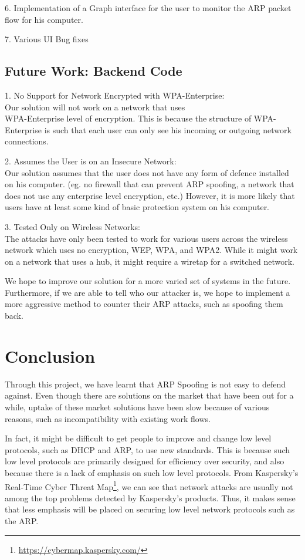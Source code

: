 \documentclass{acm_proc_article-sp}
\begin{document}
6. Implementation of a Graph interface for the user to monitor the ARP packet flow for his computer. 

7. Various UI Bug fixes

\subsection{Future Work: Backend Code}

1. No Support for Network Encrypted with WPA-Enterprise:\\
Our solution will not work on a network that uses\\ WPA-Enterprise level of encryption. This is because the structure of WPA-Enterprise is such that each user can only see his incoming or outgoing network connections. 

2. Assumes the User is on an Insecure Network: \\
Our solution assumes that the user does not have any form of defence installed on his computer. (eg. no firewall that can prevent ARP spoofing, a network that does not use any enterprise level encryption, etc.) However, it is more likely that users have at least some kind of basic protection system on his computer. 

3. Tested Only on Wireless Networks:\\
The attacks have only been tested to work for various users across the wireless network which uses no encryption, WEP, WPA, and WPA2. While it might work on a network that uses a hub, it might require a wiretap for a switched network.  

We hope to improve our solution for a more varied set of systems in the future. Furthermore, if we are able to tell who our attacker is, we hope to implement a more aggressive method to counter their ARP attacks, such as spoofing them back. 

\section{Conclusion}
Through this project, we have learnt that ARP Spoofing is not easy to defend against. Even though there are solutions on the market that have been out for a while, uptake of these market solutions have been slow because of various reasons, such as incompatibility with existing work flows. 

In fact, it might be difficult to get people to improve and change low level protocols, such as DHCP and ARP, to use new standards. This is because such low level protocols are primarily designed for efficiency over security, and also because there is a lack of emphasis on such low level protocols. From Kaspersky's Real-Time Cyber Threat Map\footnote{\url{https://cybermap.kaspersky.com/}}, we can see that network attacks are usually not among the top problems detected by Kaspersky's products. Thus, it makes sense that less emphasis will be placed on securing low level network protocols such as the ARP. 
\end{document}
